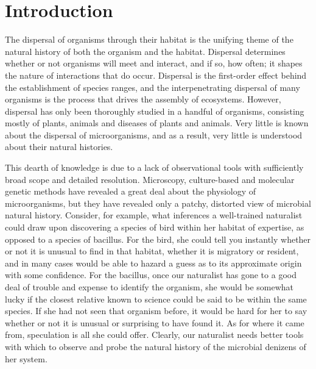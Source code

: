 \section{Introduction}

The dispersal of organisms through their habitat is the unifying theme of the natural history of both the organism and the habitat. Dispersal determines whether or not organisms will meet and interact, and if so, how often; it shapes the nature of interactions that do occur. Dispersal is the first-order effect behind the establishment of species ranges, and the interpenetrating dispersal of many organisms is the process that drives the assembly of ecosystems. However, dispersal has only been thoroughly studied in a handful of organisms, consisting mostly of plants, animals and diseases of plants and animals. Very little is known about the dispersal of microorganisms, and as a result, very little is understood about their natural histories. 

This dearth of knowledge is due to a lack of observational tools with sufficiently broad scope and detailed resolution. Microscopy, culture-based and molecular genetic methods have revealed a great deal about the physiology of microorganisms, but they have revealed only a patchy, distorted view of microbial natural history. Consider, for example, what inferences a well-trained naturalist could draw upon discovering a species of bird within her habitat of expertise, as opposed to a species of bacillus. For the bird, she could tell you instantly whether or not it is unusual to find in that habitat, whether it is migratory or resident, and in many cases would be able to hazard a guess as to its approximate origin with some confidence. For the bacillus, once our naturalist has gone to a good deal of trouble and expense to identify the organism, she would be somewhat lucky if the closest relative known to science could be said to be within the same species. If she had not seen that organism before, it would be hard for her to say whether or not it is unusual or surprising to have found it. As for where it came from, speculation is all she could offer. Clearly, our naturalist needs better tools with which to observe and probe the natural history of the microbial denizens of her system.

